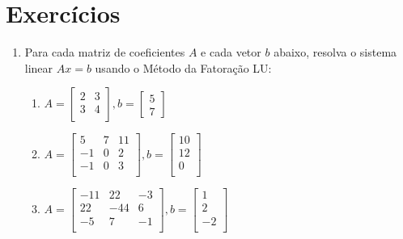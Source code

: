 \documentclass[a4paper]{article}
\begin{document}
\section{Exercícios}

\begin{enumerate}
\item Para cada matriz de coeficientes $A$ e cada vetor $b$ abaixo,
  resolva o sistema linear $Ax=b$ usando o Método da Fatoração LU:
  \begin{enumerate}
  \item %
    $A = \begin{bmatrix}
        2 & 3\\
        3 & 4\\
      \end{bmatrix},
      b= \begin{bmatrix}
        5\\
        7
      \end{bmatrix}$

  \item %
    $A = \begin{bmatrix}
      5 & 7 & 11\\
      -1 & 0 & 2\\
      -1 & 0 & 3\\
      \end{bmatrix},
      b= \begin{bmatrix}
        10\\
        12\\
        0\\
      \end{bmatrix}$

  \item %
    $A = \begin{bmatrix}
      -11 & 22 & -3\\
      22 & -44 & 6\\
      -5 & 7 & -1\\
      \end{bmatrix},
      b= \begin{bmatrix}
        1\\
        2\\
        -2\\
      \end{bmatrix}$


\end{enumerate}
\end{enumerate}
\end{document}
